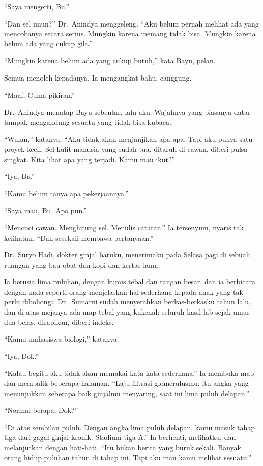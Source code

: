 \documentclass[11pt,twoside,openany]{book}
\makeatletter
\newcommand{\scenebreak}{\par\vspace{0.9em}{\centering\textsc{*\hspace{0.7em}*\hspace{0.7em}*}\par}\vspace{0.9em}\@afterindentfalse\@afterheading}
\makeatother
\begin{document}
``Saya mengerti, Bu.''

``Dan sel imun?'' Dr.~Anindya menggeleng. ``Aku belum pernah melihat ada yang mencobanya secara serius. Mungkin karena memang tidak bisa. Mungkin karena belum ada yang cukup gila.''

``Mungkin karena belum ada yang cukup butuh,'' kata Bayu, pelan.

Semua menoleh kepadanya. Ia mengangkat bahu, canggung.

``Maaf. Cuma pikiran.''

Dr.~Anindya menatap Bayu sebentar, lalu aku. Wajahnya yang biasanya datar tampak mengandung sesuatu yang tidak bisa kubaca.

``Wulan,'' katanya. ``Aku tidak akan menjanjikan apa-apa. Tapi aku punya satu proyek kecil. Sel kulit manusia yang sudah tua, ditaruh di cawan, diberi pulsa singkat. Kita lihat apa yang terjadi. Kamu mau ikut?''

``Iya, Bu.''

``Kamu belum tanya apa pekerjaannya.''

``Saya mau, Bu. Apa pun.''

``Mencuci cawan. Menghitung sel. Menulis catatan.'' Ia tersenyum, nyaris tak kelihatan. ``Dan sesekali membawa pertanyaan.''

\scenebreak
Dr.~Suryo Hadi, dokter ginjal baruku, menerimaku pada Selasa pagi di sebuah ruangan yang bau obat dan kopi dan kertas lama.

Ia berusia lima puluhan, dengan kumis tebal dan tangan besar, dan ia berbicara dengan nada seperti orang menjelaskan hal sederhana kepada anak yang tak perlu dibohongi. Dr.~Sumarni sudah menyerahkan berkas-berkasku tahun lalu, dan di atas mejanya ada map tebal yang kukenal: seluruh hasil lab sejak umur dua belas, dirapikan, diberi indeks.

``Kamu mahasiswa biologi,'' katanya.

``Iya, Dok.''

``Kalau begitu aku tidak akan memakai kata-kata sederhana.'' Ia membuka map dan membalik beberapa halaman. ``Laju filtrasi glomerulusmu, itu angka yang menunjukkan seberapa baik ginjalmu menyaring, saat ini lima puluh delapan.''

``Normal berapa, Dok?''

``Di atas sembilan puluh. Dengan angka lima puluh delapan, kamu masuk tahap tiga dari gagal ginjal kronik. Stadium tiga-A.'' Ia berhenti, melihatku, dan melanjutkan dengan hati-hati. ``Itu bukan berita yang buruk sekali. Banyak orang hidup puluhan tahun di tahap ini. Tapi aku mau kamu melihat sesuatu.''
\end{document}
